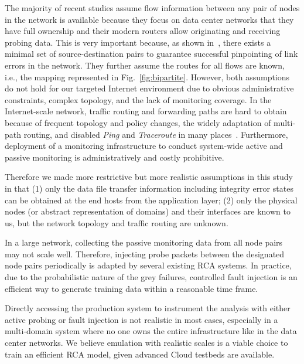 The majority of recent studies assume flow information between any pair of nodes in the network is available because they focus on data center networks that they have full ownership and their modern routers allow originating and receiving probing data. This is very important because, as shown in~\cite{netbouncer:nsdi18}, there exists a minimal set of source-destination pairs to guarantee successful pinpointing of link errors in the network. They further assume the routes for all flows are known, i.e., the mapping represented in Fig.~\ref{fig:bipartite}. However, both assumptions do not hold for our targeted Internet environment due to obvious administrative constraints, complex topology, and the lack of monitoring coverage. In the Internet-scale network, traffic routing and forwarding paths are hard to obtain because of frequent topology and policy changes, the widely adaptation of multi-path routing, and disabled {\it Ping} and {\it Traceroute} in many places~\cite{arzani2018democratically}. Furthermore, deployment of a monitoring infrastructure to conduct system-wide active and passive monitoring is administratively and costly prohibitive.     

Therefore we made more restrictive but more realistic assumptions in this study in that (1) only the data file transfer information including integrity error states can be obtained at the end hosts from the application layer; (2) only the physical nodes (or abstract representation of domains) and their interfaces are known to us, but the network topology and traffic routing are unknown. 

In a large network, collecting the passive monitoring data from all node pairs may not scale well. Therefore, injecting probe packets between the designated node pairs periodically is adapted by several existing RCA systems. In practice, due to the probabilistic nature of the grey failures, controlled fault injection is an efficient way to generate training data within a reasonable time frame.

Directly accessing the production system to instrument the analysis with either active probing or fault injection is not realistic in most cases, especially in a multi-domain system where no one owns the entire infrastructure like in the data center networks. We believe emulation with realistic scales is a viable choice to train an efficient RCA model, given advanced Cloud testbeds are available.








